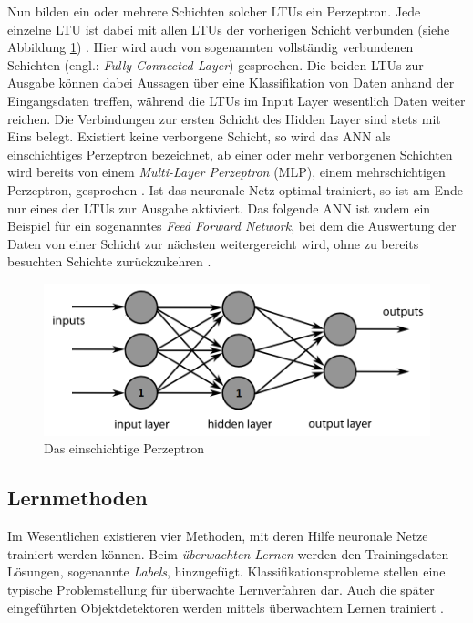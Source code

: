 Nun bilden ein oder mehrere Schichten solcher LTUs ein Perzeptron. Jede einzelne LTU ist dabei mit allen LTUs der vorherigen Schicht verbunden (siehe Abbildung \ref{neural_network}) \cite{AurelienGeron.2018}. Hier wird auch von sogenannten vollständig verbundenen Schichten (engl.: \textit{Fully-Connected Layer}) gesprochen. Die beiden LTUs zur Ausgabe können dabei Aussagen über eine Klassifikation von Daten anhand der Eingangsdaten treffen, während die LTUs im Input Layer wesentlich Daten weiter reichen. Die Verbindungen zur ersten Schicht des Hidden Layer sind stets mit Eins belegt. Existiert keine verborgene Schicht, so wird das ANN als einschichtiges Perzeptron bezeichnet, ab einer oder mehr verborgenen Schichten wird bereits von einem \textit{Multi-Layer Perzeptron} (MLP), einem mehrschichtigen Perzeptron, gesprochen \cite{AurelienGeron.2018}. Ist das neuronale Netz optimal trainiert, so ist am Ende nur eines der LTUs zur Ausgabe aktiviert. Das folgende ANN ist zudem ein Beispiel für ein sogenanntes \textit{Feed Forward Network}, bei dem die Auswertung der Daten von einer Schicht zur nächsten weitergereicht wird, ohne zu bereits besuchten Schichte zurückzukehren \cite{AurelienGeron.2018}.

\begin{figure}[ht]
	\begin{center}
		\includegraphics[width=12cm]{Bilder/neural_network.png} 
		\caption[Das einschichtige Perzeptron]{Das einschichtige Perzeptron \cite{Wikipedia.20190123}}
		\label{neural_network}
	\end{center}
\end{figure}

\subsection*{Lernmethoden}

Im Wesentlichen existieren vier Methoden, mit deren Hilfe neuronale Netze trainiert werden können. Beim \textit{überwachten Lernen} werden den Trainingsdaten Lösungen, sogenannte \textit{Labels}, hinzugefügt. Klassifikationsprobleme stellen eine typische Problemstellung für überwachte Lernverfahren dar. Auch die später eingeführten Objektdetektoren werden mittels überwachtem Lernen trainiert \cite{AurelienGeron.2018}. 

